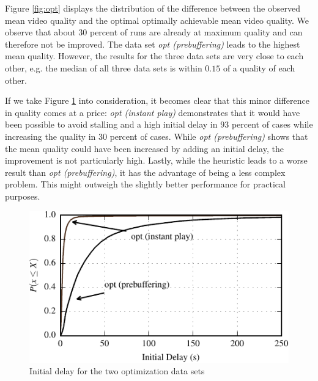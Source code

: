 Figure \ref{fig:opt} displays the distribution of the difference between the observed mean video quality and the optimal optimally achievable mean video quality. We observe that about $30$ percent of runs are already at maximum quality and can therefore not be improved. The data set \textit{opt (prebuffering)} leads to the highest mean quality. However, the results for the three data sets are very close to each other, e.g. the median of all three data sets is within $0.15$ of a quality of each other.

If we take Figure \ref{fig:initial_delay} into consideration, it becomes clear that this minor difference in quality comes at a price: \textit{opt (instant play)} demonstrates that it would have been possible to avoid stalling and a high initial delay in $93$ percent of cases while increasing the quality in $30$ percent of cases. While \textit{opt (prebuffering)} shows that the mean quality could have been increased by adding an initial delay, the improvement is not particularly high. Lastly, while the heuristic leads to a worse result than \textit{opt (prebuffering)}, it has the advantage of being a less complex problem. This might outweigh the slightly better performance for practical purposes.

\begin{figure}[t]
\centering
\includegraphics[width=1.02\columnwidth]{figs/initial_delay_py}%
\caption{Initial delay for the two optimization data sets}
\label{fig:initial_delay}%
\end{figure}

